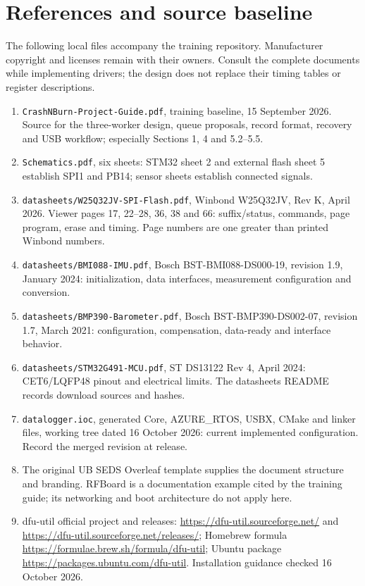 \section{References and source baseline}
The following local files accompany the training repository. Manufacturer copyright and licenses remain with their owners. Consult the complete documents while implementing drivers; the design does not replace their timing tables or register descriptions.
\begin{enumerate}[leftmargin=*]
\item \texttt{CrashNBurn-Project-Guide.pdf}, training baseline, 15 September 2026. Source for the three-worker design, queue proposals, record format, recovery and USB workflow; especially Sections 1, 4 and 5.2--5.5.
\item \texttt{Schematics.pdf}, six sheets: STM32 sheet 2 and external flash sheet 5 establish SPI1 and PB14; sensor sheets establish connected signals.
\item \texttt{datasheets/W25Q32JV-SPI-Flash.pdf}, Winbond W25Q32JV, Rev K, April 2026. Viewer pages 17, 22--28, 36, 38 and 66: suffix/status, commands, page program, erase and timing. Page numbers are one greater than printed Winbond numbers.
\item \texttt{datasheets/BMI088-IMU.pdf}, Bosch BST-BMI088-DS000-19, revision 1.9, January 2024: initialization, data interfaces, measurement configuration and conversion.
\item \texttt{datasheets/BMP390-Barometer.pdf}, Bosch BST-BMP390-DS002-07, revision 1.7, March 2021: configuration, compensation, data-ready and interface behavior.
\item \texttt{datasheets/STM32G491-MCU.pdf}, ST DS13122 Rev 4, April 2024: CET6/LQFP48 pinout and electrical limits. The datasheets README records download sources and hashes.
\item \texttt{datalogger.ioc}, generated Core, AZURE\_RTOS, USBX, CMake and linker files, working tree dated 16 October 2026: current implemented configuration. Record the merged revision at release.
\item The original UB SEDS Overleaf template supplies the document structure and branding. RFBoard is a documentation example cited by the training guide; its networking and boot architecture do not apply here.
\item dfu-util official project and releases: \url{https://dfu-util.sourceforge.net/} and \url{https://dfu-util.sourceforge.net/releases/}; Homebrew formula \url{https://formulae.brew.sh/formula/dfu-util}; Ubuntu package \url{https://packages.ubuntu.com/dfu-util}. Installation guidance checked 16 October 2026.
\end{enumerate}
